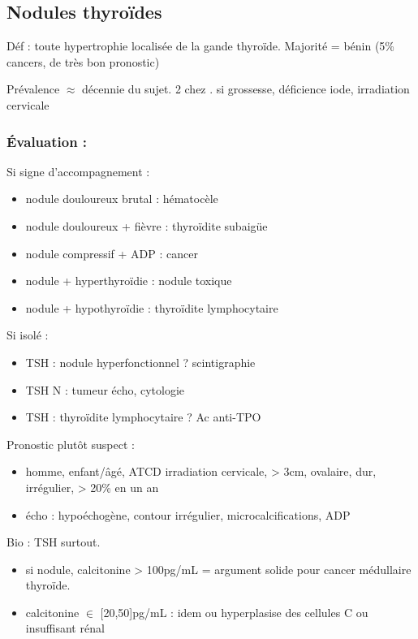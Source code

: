 \documentclass[11pt]{article}
\begin{document}
\subsection{Nodules thyroïdes}
\label{sec:orgf111a0d}
Déf : toute hypertrophie localisée de la gande thyroïde. Majorité = bénin (5\%
cancers, de très bon pronostic)

Prévalence \(\approx\) décennie du sujet. \texttimes{} 2 chez \female. \inc si grossesse,
déficience iode, irradiation cervicale

\subsubsection{Évaluation :}
\label{sec:org049517e}
Si signe d'accompagnement :
\begin{itemize}
\item nodule douloureux brutal : hématocèle
\item nodule douloureux + fièvre : thyroïdite subaigüe
\item nodule compressif + ADP : cancer
\item nodule + hyperthyroïdie : nodule toxique
\item nodule + hypothyroïdie : thyroïdite lymphocytaire
\end{itemize}
Si isolé : 
\begin{itemize}
\item TSH \dec : nodule hyperfonctionnel ? \thus scintigraphie
\item TSH N : tumeur \thus écho, cytologie
\item TSH \inc : thyroïdite lymphocytaire ? \thus Ac anti-TPO
\end{itemize}

Pronostic plutôt suspect : 
\begin{itemize}
\item homme, enfant/âgé, ATCD irradiation cervicale, > 3cm, ovalaire, dur, irrégulier, > 20\% en un an
\item écho : hypoéchogène, contour irrégulier, microcalcifications, ADP
\end{itemize}

Bio : TSH surtout. 
\begin{itemize}
\item si nodule, calcitonine > 100pg/mL = argument solide pour cancer médullaire thyroïde.
\item calcitonine \(\in\) [20,50]pg/mL : idem ou hyperplasise des cellules C ou insuffisant rénal
\end{itemize}
\end{document}
